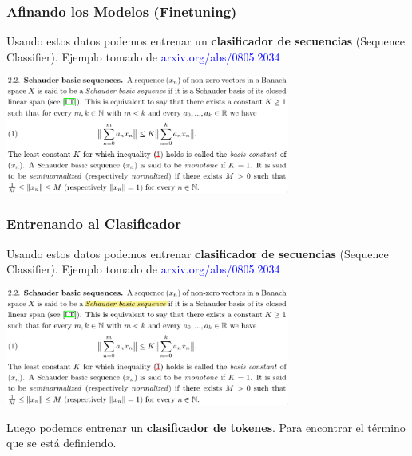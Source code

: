 \documentclass[10pt]{beamer}
\begin{document}
\begin{frame}[fragile]
\begin{itemize}
\begin{columns}
\begin{column}{0.6\textwidth}
        \end{column}
    \end{columns}

\end{itemize}
\end{frame}


\begin{frame}
    \frametitle{Afinando los Modelos (Finetuning)}
    Usando estos datos podemos entrenar un \textbf{clasificador de secuencias} (Sequence Classifier). \pause Ejemplo tomado de \textcolor{blue}{arxiv.org/abs/0805.2034}
    \begin{center}
        \includegraphics[width=0.7\textwidth]{../Images/def2.png}
    \end{center}
\end{frame}

\begin{frame}
    \frametitle{Entrenando al Clasificador}
    Usando estos datos podemos entrenar \textbf{clasificador de secuencias} (Sequence Classifier). Ejemplo tomado de \textcolor{blue}{arxiv.org/abs/0805.2034}
    \begin{center}
        \includegraphics[width=0.7\textwidth]{../Images/def_highlighted.png}
    \end{center}
    Luego podemos entrenar un \textbf{clasificador de tokenes}. Para encontrar el término que se está definiendo.
\end{frame}
\end{document}
